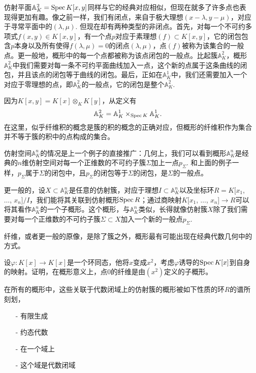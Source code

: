 
仿射平面$\mathbb{A}^2_K=\operatorname{Spec} K[x,y]$同样与它的经典对应相似，但现在就多了许多点也表现得更加有趣。像之前一样，我们有闭点，来自于极大理想$(x-\lambda,y-\mu)$，对应于寻常平面中的$(\lambda,\mu)$. 但现在却有两种类型的非闭点。首先，对每一个不可约多项式$f(x,y)\in K[x,y]$，有一个点$p$对应于素理想$(f)\subset K[x,y]$，它的闭包包含$p$本身以及所有使得$f(\lambda,\mu)=0$的闭点$(\lambda,\mu)$，点$(f)$被称为该集合的一般点。更一般地，概形中的每一个点都被称为该点闭包的一般点。比起簇$\mathbb{A}^2_K$，概形$\mathbb{A}^2_K$中我们需要对每一条不可约平面曲线加入一点，这个新的点属于这条曲线的闭包，并且该点的闭包等于曲线的闭包。最后，正如在$\mathbb{A}^1_K$中，我们还需要加入一个对应于零理想的点，即$\mathbb{A}^2_K$的一般点，它的闭包是整个$\mathbb{A}^2_K$.


因为$K[x,y]=K[x]\otimes_K K[y]$，从定义有
\[
	\mathbb{A}^2_K=\mathbb{A}^1_K\times_{\operatorname{Spec} K}\mathbb{A}^1_K.
\]
在这里，似乎纤维积的概念是簇的积的概念的正确对应，但概形的纤维积作为集合并不等于簇的积中的点构成的集合。

仿射空间$\mathbb{A}^n_K$的情况是上一个例子的直接推广：几何上，我们可以看到概形$\mathbb{A}^n_K$是经典的$n$维仿射空间对每一个正维数的不可约子簇$\Sigma$加上一点$p_\Sigma$. 和上面的例子一样，$p_\Sigma$属于$\Sigma$的闭包中，且$p_\Sigma$的闭包等于$\Sigma$的闭包，是$\Sigma$的一般点。

更一般的，设$X\subset \mathbb{A}^n_K$是任意的仿射簇，对应于理想$I\subset \mathbb{A}^n_K$以及坐标环$R=K[x_1$, $\dots$, $x_n]/I$，我们能将其关联到仿射概形$\operatorname{Spec} R$；通过商映射$K[x_1$, $\dots$, $x_n]\to R$可以将其看作$\mathbb{A}^n_K$的一个子概形。这个概形，与$\mathbb{A}^n_K$类似，长得就像仿射簇$X$除了我们需要对每一个正维数的不可约子簇$\Sigma\subset X$加入一个新的一般点$p_\Sigma$.

纤维，或者更一般的原像，是除了簇之外，概形最有可能出现在经典代数几何中的方式。

\begin{exe} \label{exe.2.2}
设$\varphi:K[x]\to K[x]$是一个环同态，他将$x$变成$x^2$，考虑$\varphi$诱导的$\operatorname{Spec} K[x]$到自身的映射。证明，在概形意义上，点$0$的纤维是由$(x^2)$定义的子概形。

\end{exe}

在所有的概形中，这些关联于代数闭域上的仿射簇的概形被如下性质的环$R$的谱所刻划，

\begin{itemize}\setlength{\itemsep}{0pt}
\item[-] 有限生成
\item[-] 约态代数
\item[-] 在一个域上
\item[-] 这个域是代数闭域
\end{itemize}

